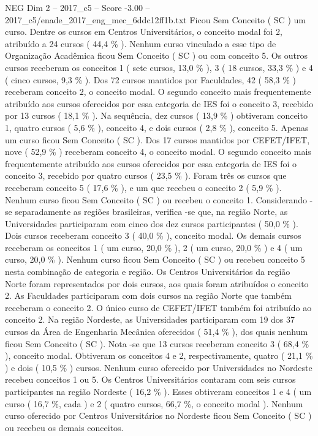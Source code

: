 \begin{textsample}{NEG Dim 2 – 2017\_c5 – Score -3.00 – 2017\_c5/enade\_2017\_eng\_mec\_6ddc12ff1b.txt}
Ficou Sem Conceito ( SC ) um curso.
Dentre os cursos em Centros Universitários, o conceito modal foi 2, atribuído a 24 cursos ( 44,4 \% ).
Nenhum curso vinculado a esse tipo de Organização Acadêmica ficou Sem Conceito ( SC ) ou com conceito 5.
Os outros cursos receberam os conceitos 1 ( sete cursos, 13,0 \% ), 3 ( 18 cursos, 33,3 \% ) e 4 ( cinco cursos, 9,3 \% ).
Dos 72 cursos mantidos por Faculdades, 42 ( 58,3 \% ) receberam conceito 2, o conceito modal.
O segundo conceito mais frequentemente atribuído aos cursos oferecidos por essa categoria de IES foi o conceito 3, recebido por 13 cursos ( 18,1 \% ).
Na sequência, dez cursos ( 13,9 \% ) obtiveram conceito 1, quatro cursos ( 5,6 \% ), conceito 4, e dois cursos ( 2,8 \% ), conceito 5.
Apenas um curso ficou Sem Conceito ( SC ).
Dos 17 cursos mantidos por CEFET/IFET, nove ( 52,9 \% ) receberam conceito 4, o conceito modal.
O segundo conceito mais frequentemente atribuído aos cursos oferecidos por essa categoria de IES foi o conceito 3, recebido por quatro cursos ( 23,5 \% ).
Foram três os cursos que receberam conceito 5 ( 17,6 \% ), e um que recebeu o conceito 2 ( 5,9 \% ).
Nenhum curso ficou Sem Conceito ( SC ) ou recebeu o conceito 1.
Considerando -se separadamente as regiões brasileiras, verifica -se que, na região Norte, as Universidades participaram com cinco dos dez cursos participantes ( 50,0 \% ).
Dois cursos receberam conceito 3 ( 40,0 \% ), conceito modal.
Os demais cursos receberam os conceitos 1 ( um curso, 20,0 \% ), 2 ( um curso, 20,0 \% ) e 4 ( um curso, 20,0 \% ).
Nenhum curso ficou Sem Conceito ( SC ) ou recebeu conceito 5 nesta combinação de categoria e região.
Os Centros Universitários da região Norte foram representados por dois cursos, aos quais foram atribuídos o conceito 2.
As Faculdades participaram com dois cursos na região Norte que também receberam o conceito 2.
O único curso de CEFET/IFET também foi atribuído ao conceito 2.
Na região Nordeste, as Universidades participaram com 19 dos 37 cursos da Área de Engenharia Mecânica oferecidos ( 51,4 \% ), dos quais nenhum ficou Sem Conceito ( SC ).
Nota -se que 13 cursos receberam conceito 3 ( 68,4 \% ), conceito modal.
Obtiveram os conceitos 4 e 2, respectivamente, quatro ( 21,1 \% ) e dois ( 10,5 \% ) cursos.
Nenhum curso oferecido por Universidades no Nordeste recebeu conceitos 1 ou 5.
Os Centros Universitários contaram com seis cursos participantes na região Nordeste ( 16,2 \% ).
Esses obtiveram conceitos 1 e 4 ( um curso ( 16,7 \%, cada ) e 2 ( quatro cursos, 66,7 \%, o conceito modal ).
Nenhum curso oferecido por Centros Universitários no Nordeste ficou Sem Conceito ( SC ) ou recebeu os demais conceitos.

\end{textsample}
